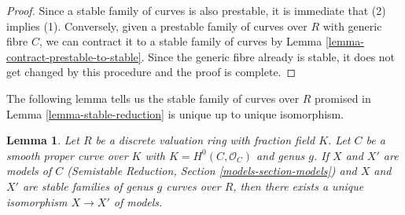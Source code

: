 \documentclass{stacks-project}
\theoremstyle{plain}
\newtheorem{lemma}[subsection]{Lemma}
\theoremstyle{definition}
\theoremstyle{remark}
\numberwithin{equation}{subsection}
\begin{document}
\begin{proof}
Since a stable family of curves is also prestable, it is immediate that
(2) implies (1). Conversely, given a prestable family of curves over $R$
with generic fibre $C$, we can contract it to a stable family of curves
by Lemma \ref{lemma-contract-prestable-to-stable}. Since the generic
fibre already is stable, it does not get changed by this procedure and
the proof is complete.
\end{proof}

\noindent
The following lemma tells us the stable family of curves over $R$
promised in Lemma \ref{lemma-stable-reduction}
is unique up to unique isomorphism.

\begin{lemma}
\label{lemma-unique-stable-model}
Let $R$ be a discrete valuation ring with fraction field $K$.
Let $C$ be a smooth proper curve over $K$
with $K = H^0(C, \mathcal{O}_C)$ and genus $g$.
If $X$ and $X'$ are models of $C$
(Semistable Reduction, Section \ref{models-section-models})
and $X$ and $X'$ are stable families of genus $g$ curves over $R$,
then there exists a unique isomorphism $X \to X'$ of models.
\end{lemma}
\end{document}
